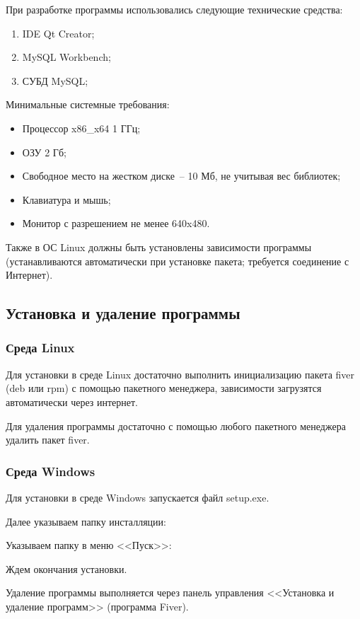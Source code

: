 \documentclass[a4paper,14pt,russian]{extreport}
\begin{document}
При разработке программы использовались следующие технические средства:

\begin{enumerate}
\item IDE Qt Creator;
\item MySQL Workbench;
\item СУБД MySQL;
\end{enumerate}

Минимальные системные требования:

\begin{itemize}
\item Процессор x86\_x64 1 ГГц;
\item ОЗУ 2 Гб;
\item Свободное место на жестком диске~-- 10 Мб, не учитывая вес библиотек;
\item Клавиатура и мышь;
\item Монитор с разрешением не менее 640x480.
\end{itemize}

Также в ОС Linux должны быть установлены зависимости программы (устанавливаются автоматически при установке пакета; требуется соединение с Интернет).
\subsection{Установка и удаление программы}
\subsubsection{Среда Linux}
Для установки в среде Linux достаточно выполнить инициализацию пакета fiver (deb или rpm) с помощью пакетного менеджера, зависимости загрузятся автоматически через интернет.

Для удаления программы достаточно с помощью любого пакетного менеджера удалить пакет fiver.

\subsubsection{Среда Windows}

Для установки в среде Windows запускается файл setup.exe.

Далее указываем папку инсталляции:

Указываем папку в меню <<Пуск>>:

Ждем окончания установки.

Удаление программы выполняется через панель управления <<Установка и удаление программ>> (программа Fiver).
\end{document}
